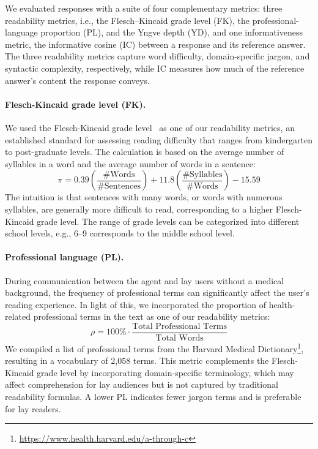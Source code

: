We evaluated responses with a suite of four complementary metrics: three readability metrics, i.e., the Flesch--Kincaid grade level (FK), the professional-language proportion (PL), and the Yngve depth (YD), and one informativeness metric, the informative cosine (IC) between a response and its reference answer. The three readability metrics capture word difficulty, domain-specific jargon, and syntactic complexity, respectively, while IC measures how much of the reference answer's content the response conveys.

\paragraph{Flesch-Kincaid grade level (FK).}
We used the Flesch-Kincaid grade level~\citep{kincaid1975derivation} as one of our readability metrics, an established standard for assessing reading difficulty that ranges from kindergarten to post-graduate levels.
The calculation is based on the average number of syllables in a word and the average number of words in a sentence:
\begin{equation}
\label{equ:grade}
    \pi = 0.39\left(\frac{\text{\#Words}}{\text{\#Sentences}}\right) + 11.8\left(\frac{\text{\#Syllables}}{\text{\#Words}}\right) - 15.59
\end{equation}
The intuition is that sentences with many words, or words with numerous syllables, are generally more difficult to read, corresponding to a higher Flesch-Kincaid grade level.
The range of grade levels can be categorized into different school levels, e.g., 6--9 corresponds to the middle school level.

\paragraph{Professional language (PL).}
During communication between the agent and lay users without a medical background, the frequency of professional terms can significantly affect the user's reading experience.
In light of this, we incorporated the proportion of health-related professional terms in the text as one of our readability metrics:
\begin{equation}
\label{equ:prof}
    \rho = 100\% \cdot \frac{\text{Total Professional Terms}}{\text{Total Words}}
\end{equation}
We compiled a list of professional terms from the Harvard Medical Dictionary\footnote{\url{https://www.health.harvard.edu/a-through-c}}, resulting in a vocabulary of 2,058 terms.
This metric complements the Flesch-Kincaid grade level by incorporating domain-specific terminology, which may affect comprehension for lay audiences but is not captured by traditional readability formulas. A lower PL indicates fewer jargon terms and is preferable for lay readers.

